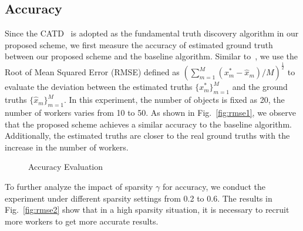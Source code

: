 \documentclass[conference]{IEEEtran}
\begin{document}
\subsection{Accuracy}
Since the CATD~\cite{li_confidence-aware_2014} is adopted as the fundamental truth discovery algorithm in our proposed scheme, we first measure the accuracy of estimated ground truth between our proposed scheme and the baseline algorithm.
Similar to~\cite{zhang_reliable_2019,xue_inpptd_2020}, we use the Root of Mean Squared Error (RMSE) defined as $(\sum\limits_{m=1}^M (x_m^* - \hat{x}_m)/M)^{\frac{1}{2}}$ to evaluate the deviation between the estimated truths $\{x_m^*\}_{m=1}^M$ and the ground truths $\{\hat{x}_m\}_{m=1}^M$.
In this experiment, the number of objects is fixed as 20, the number of workers varies from 10 to 50.
As shown in Fig.~\ref{fig:rmse1}, we observe that the proposed scheme achieves a similar accuracy to the baseline algorithm.
Additionally, the estimated truths are closer to the real ground truths with the increase in the number of workers.
\begin{figure}[htbp]
  \centering 
  \caption{Accuracy Evaluation}
  \label{fig:rmse} 
\end{figure}
To further analyze the impact of sparsity $\gamma$ for accuracy, we conduct the experiment under different sparsity settings from 0.2 to 0.6.
The results in Fig.~\ref{fig:rmse2} show that in a high sparsity situation, it is necessary to recruit more workers to get more accurate results.
\end{document}
